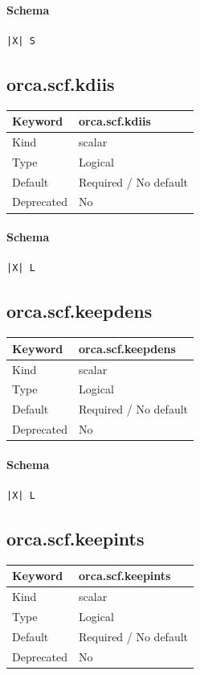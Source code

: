 \documentclass[11pt]{article}
\begin{document}
{{{{{\paragraph{Schema}
\begin{Verbatim}
|X| S
\end{Verbatim}

\subsection{orca.scf.kdiis}
\label{kw:orca-scf-kdiis}
\begin{longtable}{|p{1.5in}|p{4.5in}|}
\hline
Keyword & orca.scf.kdiis \\
\hline
Kind & scalar \\
\hline
Type & Logical \\
\hline
Default & Required / No default \\
\hline
Deprecated & No \\
\hline
\end{longtable}
\paragraph{Schema}
\begin{Verbatim}
|X| L
\end{Verbatim}

\subsection{orca.scf.keepdens}
\label{kw:orca-scf-keepdens}
\begin{longtable}{|p{1.5in}|p{4.5in}|}
\hline
Keyword & orca.scf.keepdens \\
\hline
Kind & scalar \\
\hline
Type & Logical \\
\hline
Default & Required / No default \\
\hline
Deprecated & No \\
\hline
\end{longtable}
\paragraph{Schema}
\begin{Verbatim}
|X| L
\end{Verbatim}

\subsection{orca.scf.keepints}
\label{kw:orca-scf-keepints}
\begin{longtable}{|p{1.5in}|p{4.5in}|}
\hline
Keyword & orca.scf.keepints \\
\hline
Kind & scalar \\
\hline
Type & Logical \\
\hline
Default & Required / No default \\
\hline
Deprecated & No \\
\hline
\end{longtable}
}}}}}
\end{document}
